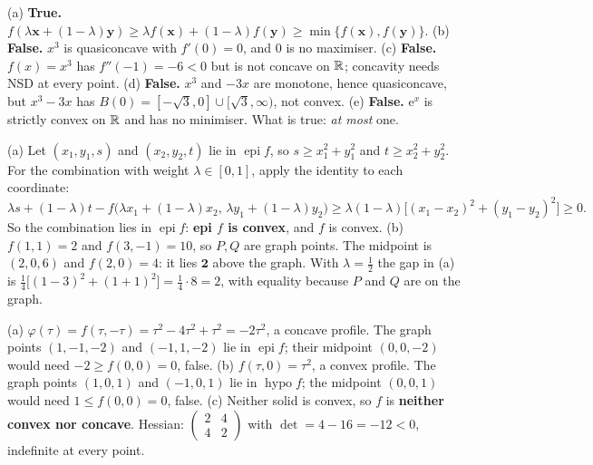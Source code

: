 \begin{solutions}
  \item (a) \textbf{True.}
        $f(\lambda\mathbf{x}+(1-\lambda)\mathbf{y})
        \ge\lambda f(\mathbf{x})+(1-\lambda)f(\mathbf{y})
        \ge\min\{f(\mathbf{x}),f(\mathbf{y})\}$.
        (b) \textbf{False.} $x^{3}$ is quasiconcave with $f'(0)=0$, and $0$
        is no maximiser.
        (c) \textbf{False.} $f(x)=x^{3}$ has $f''(-1)=-6<0$ but is not
        concave on $\mathbb{R}$; concavity needs NSD at every point.
        (d) \textbf{False.} $x^{3}$ and $-3x$ are monotone, hence
        quasiconcave, but $x^{3}-3x$ has
        $B(0)=[-\sqrt3,0]\cup[\sqrt3,\infty)$, not convex.
        (e) \textbf{False.} $\mathrm{e}^{x}$ is strictly convex on $\mathbb{R}$ and
        has no minimiser. What is true: \emph{at most} one.

  \item (a) Let $(x_1,y_1,s)$ and $(x_2,y_2,t)$ lie in
        $\operatorname{epi}f$, so $s\ge x_1^{2}+y_1^{2}$ and
        $t\ge x_2^{2}+y_2^{2}$. For the combination with weight
        $\lambda\in[0,1]$, apply the identity to each coordinate:
        \[
          \lambda s+(1-\lambda)t-f\bigl(\lambda x_1+(1-\lambda)x_2,\,
          \lambda y_1+(1-\lambda)y_2\bigr)
          \ge\lambda(1-\lambda)\bigl[(x_1-x_2)^{2}+(y_1-y_2)^{2}\bigr]\ge0 .
        \]
        So the combination lies in $\operatorname{epi}f$:
        \textbf{epi $f$ is convex}, and $f$ is convex.
        (b) $f(1,1)=2$ and $f(3,-1)=10$, so $P,Q$ are graph points. The
        midpoint is $(2,0,6)$ and $f(2,0)=4$: it lies $\mathbf{2}$ above the
        graph. With $\lambda=\tfrac12$ the gap in (a) is
        $\tfrac14\bigl[(1-3)^{2}+(1+1)^{2}\bigr]=\tfrac14\cdot8=2$,
        with equality because $P$ and $Q$ are on the graph.

  \item (a) $\varphi(\tau)=f(\tau,-\tau)=\tau^{2}-4\tau^{2}+\tau^{2}=-2\tau^{2}$,
        a concave profile. The graph points $(1,-1,-2)$ and $(-1,1,-2)$ lie
        in $\operatorname{epi}f$; their midpoint $(0,0,-2)$ would need
        $-2\ge f(0,0)=0$, false.
        (b) $f(\tau,0)=\tau^{2}$, a convex profile. The graph points
        $(1,0,1)$ and $(-1,0,1)$ lie in $\operatorname{hypo}f$; the midpoint
        $(0,0,1)$ would need $1\le f(0,0)=0$, false.
        (c) Neither solid is convex, so $f$ is \textbf{neither convex nor
        concave}. Hessian: $\begin{pmatrix}2&4\\4&2\end{pmatrix}$ with
        $\det=4-16=-12<0$, indefinite at every point. \checkmark


\end{solutions}
